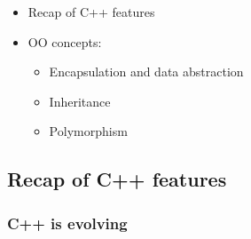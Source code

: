 \begin{itemize}
\tightlist
\item
  Recap of C++ features
\item
  OO concepts:

  \begin{itemize}
  \tightlist
  \item
    Encapsulation and data abstraction
  \item
    Inheritance
  \item
    Polymorphism
  \end{itemize}
\end{itemize}

\hypertarget{recap-of-c-features}{%
\subsection{Recap of C++ features}\label{recap-of-c-features}}

\hypertarget{c-is-evolving}{%
\subsubsection{C++ is evolving}\label{c-is-evolving}}

